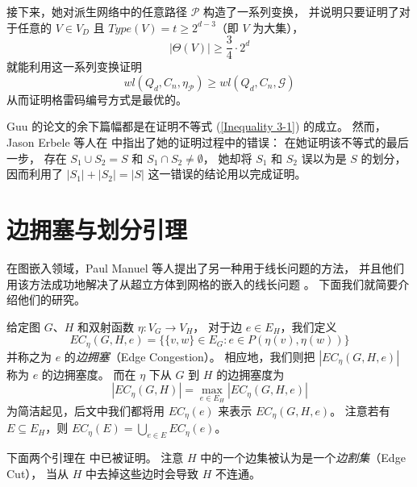 接下来，她对派生网络中的任意路径 $\mathcal{P}$ 构造了一系列变换，
并说明只要证明了对于任意的 $V \in V_D$ 且 $Type(V) = t \ge 2^{d - 3}$（即 $V$ 为大集），
\begin{equation}
\label{Inequality 3-1}
|\Theta(V)| \ge \frac{3}{4} \cdot 2^d
\end{equation}
就能利用这一系列变换证明
\begin{equation*}
wl(Q_d, C_n, \eta_\mathcal{P}) \ge wl(Q_d, C_n, \mathcal{G})
\end{equation*}
从而证明格雷码编号方式是最优的。

Guu 的论文的余下篇幅都是在证明不等式 (\ref{Inequality 3-1}) 的成立。
然而，Jason Erbele 等人在 \cite{Erbele.2003} 中指出了她的证明过程中的错误：
在她证明该不等式的最后一步，
存在 $S_1 \cup S_2 = S$ 和 $S_1 \cap S_2 \neq \emptyset$，
她却将 $S_1$ 和 $S_2$ 误以为是 $S$ 的划分，
因而利用了 $|S_1| + |S_2| = |S|$ 这一错误的结论用以完成证明。

\section{边拥塞与划分引理}
\label{Section 3.3}

在图嵌入领域，Paul Manuel 等人提出了另一种用于线长问题的方法，
并且他们用该方法成功地解决了从超立方体到网格的嵌入的线长问题 \cite{Manuel.2009}。
下面我们就简要介绍他们的研究。

给定图 $G$、$H$ 和双射函数 $\eta \colon V_G \rightarrow V_H$，
对于边 $e \in E_H$，我们定义
\begin{equation*}
EC_\eta(G, H, e) = \{\{v, w\} \in E_G \colon e \in P(\eta(v), \eta(w))\}
\end{equation*}
并称之为 $e$ 的\emph{边拥塞}（Edge Congestion）。
相应地，我们则把 $|EC_\eta(G, H, e)|$ 称为 $e$ 的边拥塞度。
而在 $\eta$ 下从 $G$ 到 $H$ 的边拥塞度为
\begin{equation*}
|EC_\eta(G, H)| = \max_{e \in E_H} |EC_\eta(G, H, e)|
\end{equation*}
为简洁起见，后文中我们都将用 $EC_\eta(e)$ 来表示 $EC_\eta(G, H, e)$。
注意若有 $E \subseteq E_H$，则 $EC_\eta(E) = \bigcup_{e \in E} EC_\eta(e)$。

下面两个引理在 \cite{Manuel.2009} 中已被证明。
注意 $H$ 中的一个边集被认为是一个\emph{边割集}（Edge Cut），
当从 $H$ 中去掉这些边时会导致 $H$ 不连通。

